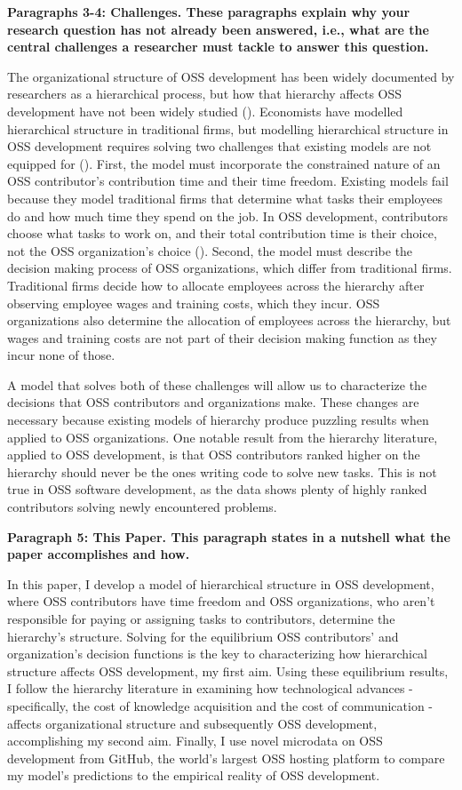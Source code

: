 \documentclass[12pt,notitlepage]{article}
\begin{document}
\textbf{Paragraphs 3-4: Challenges. These paragraphs explain why your research question has not already been answered, i.e., what are the central challenges a researcher must tackle to answer this question.}

\qquad The organizational structure of OSS development has been widely documented by researchers as a hierarchical process, but how that hierarchy affects OSS development have not been widely studied (\cite{crowston_hierarchy_2006}). Economists have modelled hierarchical structure in traditional firms, but modelling hierarchical structure in OSS development requires solving two challenges that existing models are not equipped for (\cite{garicano_hierarchies_2000}). First, the model must incorporate the constrained nature of an OSS contributor's contribution time and their time freedom. Existing models fail because they model traditional firms that determine what tasks their employees do and how much time they spend on the job. In OSS development, contributors choose what tasks to work on, and their total contribution time is their choice, not the OSS organization's choice (\cite{lerner_simple_2002}). Second, the model must describe the decision making process of OSS organizations, which differ from traditional firms. Traditional firms decide how to allocate employees across the hierarchy after observing employee wages and training costs, which they incur. OSS organizations also determine the allocation of employees across the hierarchy, but wages and training costs are not part of their decision making function as they incur none of those. 

\qquad A model that solves both of these challenges will allow us to characterize the decisions that OSS contributors and organizations make. These changes are necessary because existing models of hierarchy produce puzzling results when applied to OSS organizations. One notable result from the hierarchy literature, applied to OSS development, is that OSS contributors ranked higher on the hierarchy should never be the ones writing code to solve new tasks. This is not true in OSS software development, as the data shows plenty of highly ranked contributors solving newly encountered problems. 


\textbf{Paragraph 5: This Paper. This paragraph states in a nutshell what the paper accomplishes and how. }

In this paper, I develop a model of hierarchical structure in OSS development, where OSS contributors have time freedom and OSS organizations, who aren't responsible for paying or assigning tasks to contributors, determine the hierarchy's structure. Solving for the equilibrium OSS contributors' and organization's decision functions is the key to characterizing how hierarchical structure affects OSS development, my first aim. Using these equilibrium results, I follow the hierarchy literature in examining how technological advances - specifically, the cost of knowledge acquisition and the cost of communication - affects organizational structure and subsequently OSS development, accomplishing my second aim. Finally, I use novel microdata on OSS development from GitHub, the world's largest OSS hosting platform to compare my model's predictions to the empirical reality of OSS development. 
\end{document}
